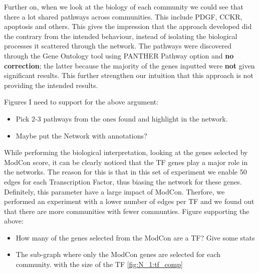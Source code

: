 Further on, when we look at the biology of each community we could see that there a lot shared pathways across communities. This include PDGF, CCKR, apoptosis and others. This gives the impression that the approach developed did the contrary from the intended behaviour, instead of isolating the biological processes it scattered through the network. The pathways were discovered through the Gene Ontology tool using PANTHER Pathway option and \textbf{no correction}; the latter because the majority of the genes inputted were \textbf{not} given significant results. This further strengthen our intuition that this approach is not providing the intended results.

Figures I need to support for the above argument:
\begin{itemize}
    \item Pick 2-3 pathways from the ones found and highlight in the network.
    \item Maybe put the Network with annotations?
\end{itemize}

While performing the biological interpretation, looking at the genes selected by ModCon score, it can be clearly noticed that the TF genes play a major role in the networks. The reason for this is that in this set of experiment we enable 50 edges for each Transcription Factor, thus biasing the network for these genes. Definitely, this parameter have a large impact of ModCon. Therfore, we performed an experiment with a lower number of edges per TF and we found out that there are more communities with fewer communties.
Figure supporting the above:
\begin{itemize}
    \item How many of the genes selected from the ModCon are a TF? Give some stats
    \item The sub-graph where only the ModCon genes are selected for each community. with the size of the TF \ref{fig:N_1:tf_comp}
\end{itemize}

